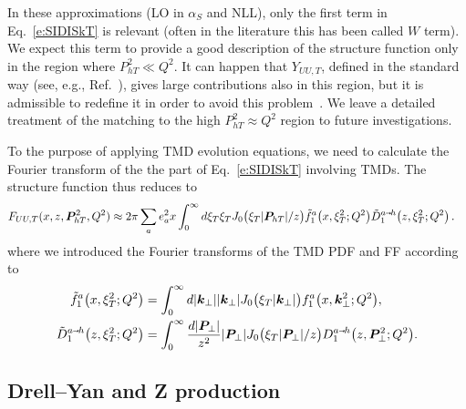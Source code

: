 \documentclass[aps,preprintnumbers,showpacs,nofootinbib,superscriptaddress,floatfix]{revtex4}
\newcommand{\smarrow}{\mbox{\raisebox{-4.5pt}[0pt][0pt]{$\hspace{-1pt} 
		\vec{\phantom{v}}$}}}
\newcommand{\T}{\perp}
\newcommand{\Tperp}{T}
\newcommand{\bT}{\xi_T}
\begin{document}
In these approximations (LO in $\alpha_S$ and NLL), only the first term in
Eq.~\eqref{e:SIDISkT} is relevant (often in the
literature this has been called $W$ term). We expect this term to provide a
good description of the
structure function only in the region where $P_{hT}^2 \ll Q^2$. 
It can happen that $Y_{UU,T}$, defined
in the standard way (see, e.g., Ref.~\cite{Collins:1984kg}), gives large
contributions also in this region, but it is admissible to
redefine it in order to avoid this problem~\cite{Collins:2016hqq}. 
We leave a detailed treatment of the matching to the high $P_{hT}^2 \approx Q^2$
region to future investigations.   

To the purpose of applying TMD evolution equations, we
 need to calculate the Fourier transform of the the part of 
Eq.~\eqref{e:SIDISkT} involving TMDs. The structure function thus reduces to 
\begin{align}
\label{e:SIDISkTFF}
   F_{UU,T}(x,z, \bm{P}_{h \Tperp}^2, Q^2) &\approx 2\pi \sum_a e_a^2 x 
       \int_0^{\infty} {d \bT} \bT J_0\big(\bT |\bm{P}_{hT}|/z\big)
      \tilde{f}_1^a\big(x, \bT^2;Q^2\big) \tilde{D}_1^{a\smarrow h}\big(z, \bT^2;
      Q^2 \big) 
\nonumber \, .
\end{align} 
where we introduced the Fourier transforms of the TMD PDF and FF according to
\begin{align} 
\tilde{f}_1^a\big(x, \bT^2;Q^2\big) &=
\int_0^{\infty} d |\bm{k}_\T| 
                |\bm{k}_\T|J_0\big(\bT |\bm{k}_\T|\big) 
       f_1^a\big(x, \bm{k}_\T^2;Q^2\big),
\\
\tilde{D}_1^{a\smarrow h}\big(z, \bT^2; Q^2 \big) &=
\int_0^{\infty} \frac{d |\bm{P}_{\T}|}{z^2} |\bm{P}_{\T}| 
                                             J_0\big(\bT |\bm{P}_{\T}|/z\big)
       D_1^{a\smarrow h}\big(z, \bm{P}_{\T}^2; Q^2 \big).
\end{align}  


\subsection{Drell--Yan and Z production}
\label{ss:DY_formalism}
\end{document}
